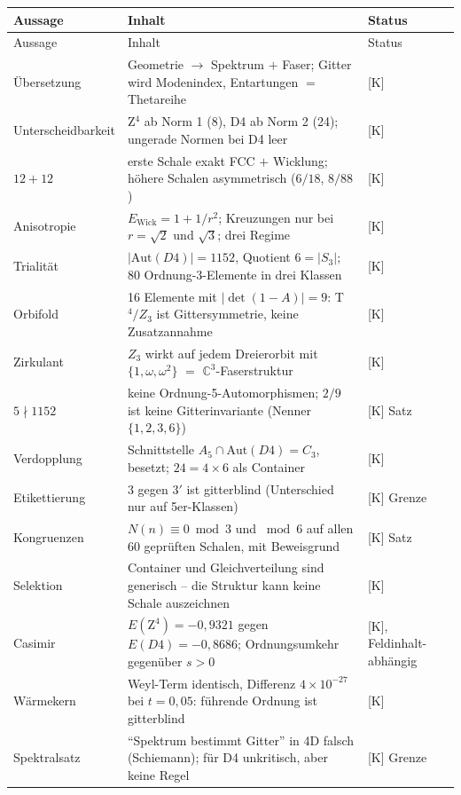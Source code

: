 {\small
\begin{longtable}{lp{6.4cm}l}
\toprule
Aussage & Inhalt & Status \\
\midrule
\endfirsthead
\toprule
Aussage & Inhalt & Status \\
\midrule
\endhead
\bottomrule
\endfoot
Übersetzung & Geometrie $\to$ Spektrum $+$ Faser; Gitter wird
  Modenindex, Entartungen $=$ Thetareihe & [K] \\
Unterscheidbarkeit & Z$^4$ ab Norm 1 (8), D4 ab Norm 2 (24);
  ungerade Normen bei D4 leer & [K] \\
$12+12$ & erste Schale exakt FCC $+$ Wicklung; höhere Schalen
  asymmetrisch ($6/18$, $8/88$) & [K] \\
Anisotropie & $E_\text{Wick} = 1 + 1/r^2$; Kreuzungen nur bei
  $r = \sqrt2$ und $\sqrt3$; drei Regime & [K] \\
Trialität & $|\text{Aut}(D4)| = 1152$, Quotient $6 = |S_3|$;
  80 Ordnung-3-Elemente in drei Klassen & [K] \\
Orbifold & 16 Elemente mit $|\det(1-A)| = 9$: T$^4/Z_3$ ist
  Gittersymmetrie, keine Zusatzannahme & [K] \\
Zirkulant & $Z_3$ wirkt auf jedem Dreierorbit mit
  $\{1,\omega,\omega^2\}$ $=$ $\mathbb{C}^3$-Faserstruktur & [K] \\
$5 \nmid 1152$ & keine Ordnung-5-Automorphismen; $2/9$ ist keine
  Gitterinvariante (Nenner $\{1,2,3,6\}$) & [K] Satz \\
Verdopplung & Schnittstelle $A_5 \cap \text{Aut}(D4) = C_3$,
  besetzt; $24 = 4\times6$ als Container & [K] \\
Etikettierung & $3$ gegen $3'$ ist gitterblind (Unterschied nur auf
  5er-Klassen) & [K] Grenze \\
Kongruenzen & $N(n) \equiv 0 \bmod 3$ und $\bmod 6$ auf allen
  60 geprüften Schalen, mit Beweisgrund & [K] Satz \\
Selektion & Container und Gleichverteilung sind generisch --
  die Struktur kann keine Schale auszeichnen & [K] \\
Casimir & $E(\text{Z}^4) = -0{,}9321$ gegen
  $E(D4) = -0{,}8686$; Ordnungsumkehr gegenüber $s>0$
  & [K], Feldinhalt-abhängig \\
Wärmekern & Weyl-Term identisch, Differenz $4\times10^{-27}$ bei
  $t = 0{,}05$: führende Ordnung ist gitterblind & [K] \\
Spektralsatz & \enquote{Spektrum bestimmt Gitter} in 4D falsch
  (Schiemann); für D4 unkritisch, aber keine Regel & [K] Grenze \\

\end{longtable}}
